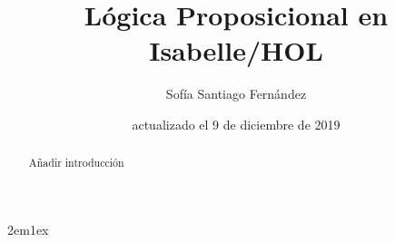 \documentclass[12pt,a4paper]{article}
\begin{document}
\title{Lógica Proposicional en Isabelle/HOL}
\author{Sofía Santiago Fernández}
\date{actualizado el 9 de diciembre de 2019}
\maketitle

\begin{abstract}
  Añadir introducción
\end{abstract}

\tableofcontents

\parindent 2em\parskip 1ex



\nocite{LMF,tutorial,fitting1996first,CC}


\end{document}
